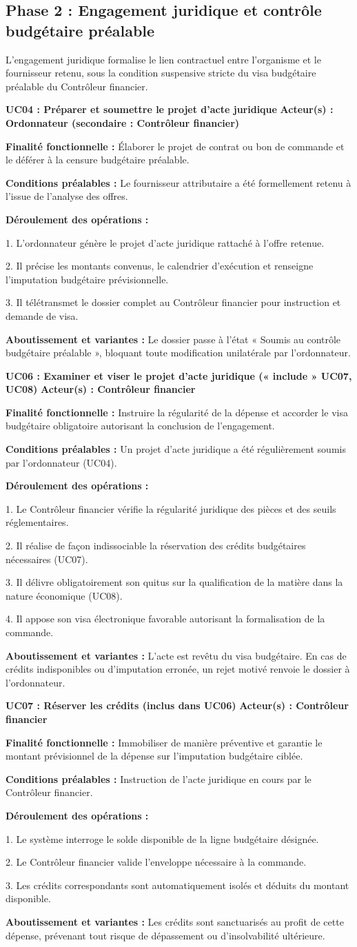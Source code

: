 \documentclass[11pt,a4paper]{article}
\newcommand{\ficheusecase}[6]{
  \vspace{0.45em}
  {\noindent\raggedright\textbf{\sffamily\normalsize\color{BleuInstitutionnel}#1} \hfill {\scriptsize\sffamily\bfseries\color{BleuSecondaire} Acteur(s) : #2}\par}
  \vspace{0.1em}
  {\small\textbf{Finalité fonctionnelle :} #3\par}
  {\small\textbf{Conditions préalables :} #4\par}
  {\small\textbf{Déroulement des opérations :}\par
  \vspace{0.05em}
  #5\par}
  \vspace{0.05em}
  {\small\color{BleuSecondaire}\textbf{Aboutissement et variantes :} #6\par}
  \vspace{0.35em}
}
\begin{document}
\subsection{Phase 2 : Engagement juridique et contrôle budgétaire préalable}

L'engagement juridique formalise le lien contractuel entre l'organisme et le fournisseur retenu, sous la condition suspensive stricte du visa budgétaire préalable du Contrôleur financier.

\ficheusecase{UC04 : Préparer et soumettre le projet d'acte juridique}
{Ordonnateur (secondaire : Contrôleur financier)}
{Élaborer le projet de contrat ou bon de commande et le déférer à la censure budgétaire préalable.}
{Le fournisseur attributaire a été formellement retenu à l'issue de l'analyse des offres.}
{1. L'ordonnateur génère le projet d'acte juridique rattaché à l'offre retenue.\par
2. Il précise les montants convenus, le calendrier d'exécution et renseigne l'imputation budgétaire prévisionnelle.\par
3. Il télétransmet le dossier complet au Contrôleur financier pour instruction et demande de visa.}
{Le dossier passe à l'état « Soumis au contrôle budgétaire préalable », bloquant toute modification unilatérale par l'ordonnateur.}

\ficheusecase{UC06 : Examiner et viser le projet d'acte juridique (« include » UC07, UC08)}
{Contrôleur financier}
{Instruire la régularité de la dépense et accorder le visa budgétaire obligatoire autorisant la conclusion de l'engagement.}
{Un projet d'acte juridique a été régulièrement soumis par l'ordonnateur (UC04).}
{1. Le Contrôleur financier vérifie la régularité juridique des pièces et des seuils réglementaires.\par
2. Il réalise de façon indissociable la réservation des crédits budgétaires nécessaires (UC07).\par
3. Il délivre obligatoirement son quitus sur la qualification de la matière dans la nature économique (UC08).\par
4. Il appose son visa électronique favorable autorisant la formalisation de la commande.}
{L'acte est revêtu du visa budgétaire. En cas de crédits indisponibles ou d'imputation erronée, un rejet motivé renvoie le dossier à l'ordonnateur.}

\ficheusecase{UC07 : Réserver les crédits (inclus dans UC06)}
{Contrôleur financier}
{Immobiliser de manière préventive et garantie le montant prévisionnel de la dépense sur l'imputation budgétaire ciblée.}
{Instruction de l'acte juridique en cours par le Contrôleur financier.}
{1. Le système interroge le solde disponible de la ligne budgétaire désignée.\par
2. Le Contrôleur financier valide l'enveloppe nécessaire à la commande.\par
3. Les crédits correspondants sont automatiquement isolés et déduits du montant disponible.}
{Les crédits sont sanctuarisés au profit de cette dépense, prévenant tout risque de dépassement ou d'insolvabilité ultérieure.}
\end{document}
